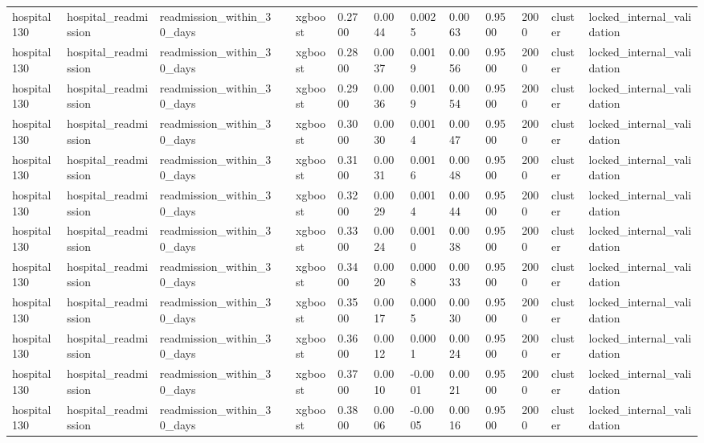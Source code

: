 \begin{tabular}{lllllllllllll}
hospital130 & hospital\_readmission & readmission\_within\_30\_days &  & xgboost & 0.2700 & 0.0044 & 0.0025 & 0.0063 & 0.9500 & 2000 & cluster & locked\_internal\_validation \\
hospital130 & hospital\_readmission & readmission\_within\_30\_days &  & xgboost & 0.2800 & 0.0037 & 0.0019 & 0.0056 & 0.9500 & 2000 & cluster & locked\_internal\_validation \\
hospital130 & hospital\_readmission & readmission\_within\_30\_days &  & xgboost & 0.2900 & 0.0036 & 0.0019 & 0.0054 & 0.9500 & 2000 & cluster & locked\_internal\_validation \\
hospital130 & hospital\_readmission & readmission\_within\_30\_days &  & xgboost & 0.3000 & 0.0030 & 0.0014 & 0.0047 & 0.9500 & 2000 & cluster & locked\_internal\_validation \\
hospital130 & hospital\_readmission & readmission\_within\_30\_days &  & xgboost & 0.3100 & 0.0031 & 0.0016 & 0.0048 & 0.9500 & 2000 & cluster & locked\_internal\_validation \\
hospital130 & hospital\_readmission & readmission\_within\_30\_days &  & xgboost & 0.3200 & 0.0029 & 0.0014 & 0.0044 & 0.9500 & 2000 & cluster & locked\_internal\_validation \\
hospital130 & hospital\_readmission & readmission\_within\_30\_days &  & xgboost & 0.3300 & 0.0024 & 0.0010 & 0.0038 & 0.9500 & 2000 & cluster & locked\_internal\_validation \\
hospital130 & hospital\_readmission & readmission\_within\_30\_days &  & xgboost & 0.3400 & 0.0020 & 0.0008 & 0.0033 & 0.9500 & 2000 & cluster & locked\_internal\_validation \\
hospital130 & hospital\_readmission & readmission\_within\_30\_days &  & xgboost & 0.3500 & 0.0017 & 0.0005 & 0.0030 & 0.9500 & 2000 & cluster & locked\_internal\_validation \\
hospital130 & hospital\_readmission & readmission\_within\_30\_days &  & xgboost & 0.3600 & 0.0012 & 0.0001 & 0.0024 & 0.9500 & 2000 & cluster & locked\_internal\_validation \\
hospital130 & hospital\_readmission & readmission\_within\_30\_days &  & xgboost & 0.3700 & 0.0010 & -0.0001 & 0.0021 & 0.9500 & 2000 & cluster & locked\_internal\_validation \\
hospital130 & hospital\_readmission & readmission\_within\_30\_days &  & xgboost & 0.3800 & 0.0006 & -0.0005 & 0.0016 & 0.9500 & 2000 & cluster & locked\_internal\_validation \\

\end{tabular}
